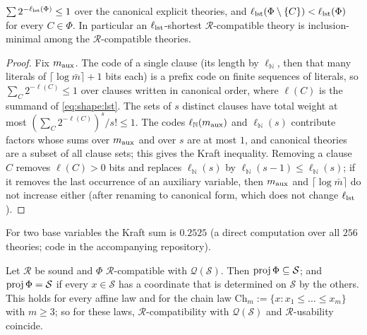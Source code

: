 \begin{lemma}\label{lem:shape:code}
$\sum2^{-\ell_{\rm lst}(\Phi)}\le1$ over the canonical explicit theories, and $\ell_{\rm lst}(\Phi\setminus\{C\})<\ell_{\rm lst}(\Phi)$ for every $C\in\Phi$. In particular an $\ell_{\rm lst}$-shortest $\mathcal R$-compatible theory is inclusion-minimal among the $\mathcal R$-compatible theories.
\end{lemma}

\begin{proof}
Fix $m_{\rm aux}$. The code of a single clause (its length by $\ell_{\mathbb N}$, then that many literals of $\lceil\log\bar m\rceil+1$ bits each) is a prefix code on finite sequences of literals, so $\sum_C2^{-\ell(C)}\le1$ over clauses written in canonical order, where $\ell(C)$ is the summand of \eqref{eq:shape:lst}. The sets of $s$ distinct clauses have total weight at most $(\sum_C2^{-\ell(C)})^s/s!\le1$. The codes $\ell_{\mathbb N}(m_{\rm aux})$ and $\ell_{\mathbb N}(s)$ contribute factors whose sums over $m_{\rm aux}$ and over $s$ are at most $1$, and canonical theories are a subset of all clause sets; this gives the Kraft inequality. Removing a clause $C$ removes $\ell(C)>0$ bits and replaces $\ell_{\mathbb N}(s)$ by $\ell_{\mathbb N}(s-1)\le\ell_{\mathbb N}(s)$; if it removes the last occurrence of an auxiliary variable, then $m_{\rm aux}$ and $\lceil\log\bar m\rceil$ do not increase either (after renaming to canonical form, which does not change $\ell_{\rm lst}$).
\end{proof}

For two base variables the Kraft sum is $0.2525$ (a direct computation over all $256$ theories; code in the accompanying repository).

\begin{lemma}\label{lem:shape:forces}
Let $\mathcal R$ be sound and $\Phi$ $\mathcal R$-compatible with $\mathcal Q(\mathcal S)$. Then $\operatorname{proj}\Phi\subseteq\mathcal S$; and $\operatorname{proj}\Phi=\mathcal S$ if every $x\in\mathcal S$ has a coordinate that is determined on $\mathcal S$ by the others. This holds for every affine law and for the chain law $\mathrm{Ch}_m:=\{x:x_1\le\dots\le x_m\}$ with $m\ge3$; so for these laws, $\mathcal R$-compatibility with $\mathcal Q(\mathcal S)$ and $\mathcal R$-usability coincide.
\end{lemma}

